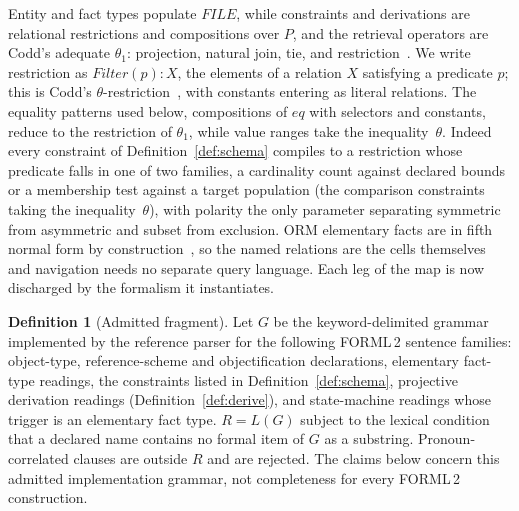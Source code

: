 \documentclass[10pt,twocolumn]{article}
\theoremstyle{plain}
\theoremstyle{definition}
\newtheorem{definition}{Definition}
\begin{document}
\noindent Entity and fact types populate $\mathit{FILE}$, while constraints and derivations are relational restrictions and compositions over $P$, and the retrieval operators are Codd's adequate $\theta_1$: projection, natural join, tie, and restriction~\cite[Sec.\,2.2]{codd70}. We write restriction as $\mathit{Filter}(p)\!:\!X$, the elements of a relation $X$ satisfying a predicate $p$; this is Codd's $\theta$-restriction~\cite[Sec.\,2.3.5]{codd72}, with constants entering as literal relations. The equality patterns used below, compositions of $\mathit{eq}$ with selectors and constants, reduce to the restriction of $\theta_1$, while value ranges take the inequality~$\theta$. Indeed every constraint of Definition~\ref{def:schema} compiles to a restriction whose predicate falls in one of two families, a cardinality count against declared bounds or a membership test against a target population (the comparison constraints taking the inequality~$\theta$), with polarity the only parameter separating symmetric from asymmetric and subset from exclusion. ORM elementary facts are in fifth normal form by construction~\cite{halpin08}, so the named relations are the cells themselves and navigation needs no separate query language. Each leg of the map is now discharged by the formalism it instantiates.

\begin{definition}[Admitted fragment]\label{def:fragment}
Let $G$ be the keyword-delimited grammar implemented by the reference parser for the following FORML\,2 sentence families: object-type, reference-scheme and objectification declarations, elementary fact-type readings, the constraints listed in Definition~\ref{def:schema}, projective derivation readings (Definition~\ref{def:derive}), and state-machine readings whose trigger is an elementary fact type. $R=L(G)$ subject to the lexical condition that a declared name contains no formal item of $G$ as a substring. Pronoun-correlated clauses are outside $R$ and are rejected. The claims below concern this admitted implementation grammar, not completeness for every FORML\,2 construction.
\end{definition}
\end{document}
